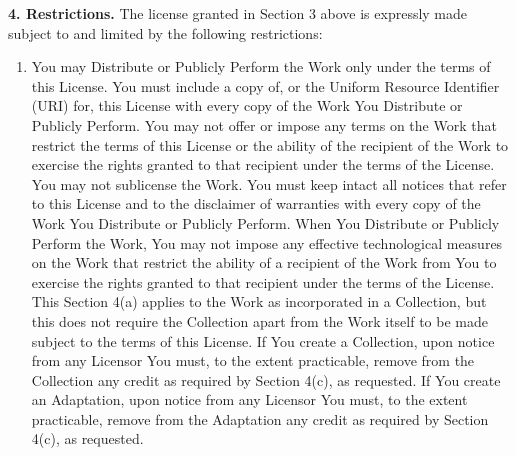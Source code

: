     \noindent \textbf{4. Restrictions.} The license granted in Section 3 above is expressly made subject to and limited by the following restrictions:
    
    \begin{enumerate}[noitemsep,label=\alph*.]
      
      \item You may Distribute or Publicly Perform the Work only under the terms of this License. You must include a copy of, or the Uniform Resource Identifier (URI) for, this License with every copy of the Work You Distribute or Publicly Perform. You may not offer or impose any terms on the Work that restrict the terms of this License or the ability of the recipient of the Work to exercise the rights granted to that recipient under the terms of the License. You may not sublicense the Work. You must keep intact all notices that refer to this License and to the disclaimer of warranties with every copy of the Work You Distribute or Publicly Perform. When You Distribute or Publicly Perform the Work, You may not impose any effective technological measures on the Work that restrict the ability of a recipient of the Work from You to exercise the rights granted to that recipient under the terms of the License. This Section 4(a) applies to the Work as incorporated in a Collection, but this does not require the Collection apart from the Work itself to be made subject to the terms of this License. If You create a Collection, upon notice from any Licensor You must, to the extent practicable, remove from the Collection any credit as required by Section 4(c), as requested. If You create an Adaptation, upon notice from any Licensor You must, to the extent practicable, remove from the Adaptation any credit as required by Section 4(c), as requested.
      

\end{enumerate}
